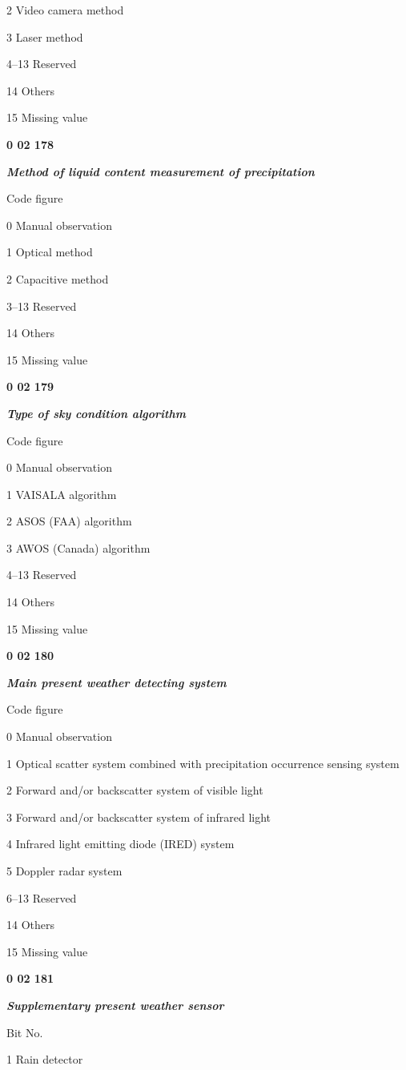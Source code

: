 2 Video camera method

3 Laser method

4--13 Reserved

14 Others

15 Missing value

\textbf{0 02 178}

\emph{\textbf{Method of liquid content measurement of precipitation}}

Code figure

0 Manual observation

1 Optical method

2 Capacitive method

3--13 Reserved

14 Others

15 Missing value

\textbf{0 02 179}

\emph{\textbf{Type of sky condition algorithm}}

Code figure

0 Manual observation

1 VAISALA algorithm

2 ASOS (FAA) algorithm

3 AWOS (Canada) algorithm

4--13 Reserved

14 Others

15 Missing value

\textbf{0 02 180}

\emph{\textbf{Main present weather detecting system}}

Code figure

0 Manual observation

1 Optical scatter system combined with precipitation occurrence sensing system

2 Forward and/or backscatter system of visible light

3 Forward and/or backscatter system of infrared light

4 Infrared light emitting diode (IRED) system

5 Doppler radar system

6--13 Reserved

14 Others

15 Missing value

\textbf{0 02 181}

\emph{\textbf{Supplementary present weather sensor}}

Bit No.

1 Rain detector


